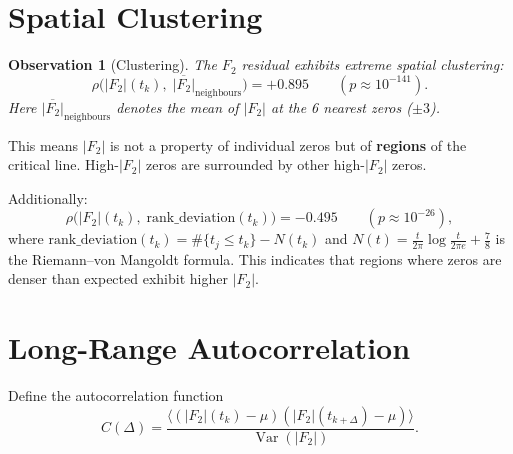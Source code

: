 \documentclass[11pt,a4paper]{article}
\newtheorem{observation}[theorem]{Observation}
\newcommand{\Ftwo}{|F_2|}
\begin{document}
\section{Spatial Clustering}

\begin{observation}[Clustering]\label{obs:clustering}
The $F_2$ residual exhibits extreme spatial clustering:
\[
  \rho\bigl(\Ftwo(t_k),\; \overline{\Ftwo}_{\text{neighbours}}\bigr) = +0.895
  \qquad (p \approx 10^{-141}).
\]
Here $\overline{\Ftwo}_{\text{neighbours}}$ denotes the mean of
$\Ftwo$ at the 6 nearest zeros ($\pm 3$).
\end{observation}

This means $\Ftwo$ is not a property of individual zeros but of \textbf{regions}
of the critical line.
High-$\Ftwo$ zeros are surrounded by other high-$\Ftwo$ zeros.

Additionally:
\[
  \rho\bigl(\Ftwo(t_k),\; \text{rank\_deviation}(t_k)\bigr) = -0.495
  \qquad (p \approx 10^{-26}),
\]
where $\text{rank\_deviation}(t_k) = \#\{t_j \leq t_k\} - N(t_k)$ and
$N(t) = \frac{t}{2\pi}\log\frac{t}{2\pi e} + \frac{7}{8}$
is the Riemann--von Mangoldt formula.
This indicates that regions where zeros are denser than expected
exhibit higher $\Ftwo$.

\section{Long-Range Autocorrelation}

Define the autocorrelation function
\[
  C(\Delta) = \frac{\langle (\Ftwo(t_k) - \mu)(\Ftwo(t_{k+\Delta}) - \mu) \rangle}
  {\operatorname{Var}(\Ftwo)}.
\]
\end{document}
